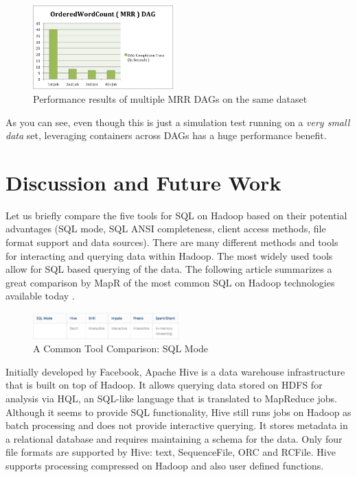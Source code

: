 \documentclass[twocolumn]{article}
\begin{document}
\begin{figure}[htb]
        \centering
        \includegraphics[width=0.48\textwidth]{sessions-tez2}
        \caption{Performance results of multiple MRR DAGs on the same dataset}
        \label{fig18}
\end{figure}

As you can see, even though this is just a simulation test running on a
\emph{very small data} set, leveraging containers across DAGs has a huge
performance benefit.

\section{Discussion and Future Work}
Let us briefly compare the five tools for SQL on Hadoop based on their potential advantages (SQL mode, SQL ANSI completeness, client access methods, file format support and data sources).
There are many different methods and tools for interacting and querying data within Hadoop. The most widely used tools allow for SQL based querying of the data. The following article summarizes a great comparison by MapR of the most common SQL on Hadoop technologies available today \cite{Intelli:2014}.

\begin{figure}[htb]
        \centering
        \includegraphics[width=0.5\textwidth]{dst01}
        \caption{A Common Tool Comparison: SQL Mode}
        \label{dst01}
\end{figure}

Initially developed by Facebook, Apache Hive is a data warehouse infrastructure that is built on top of Hadoop. It allows querying data stored on HDFS for analysis via HQL, an SQL-like language that is translated to MapReduce jobs. Although it seems to provide SQL functionality, Hive still runs jobs on Hadoop as batch processing and does not provide interactive querying. It stores metadata in a relational database and requires maintaining a schema for the data. Only four file formats are supported by Hive: text, SequenceFile, ORC and RCFile. Hive supports processing compressed on Hadoop and also user defined functions.
\end{document}
